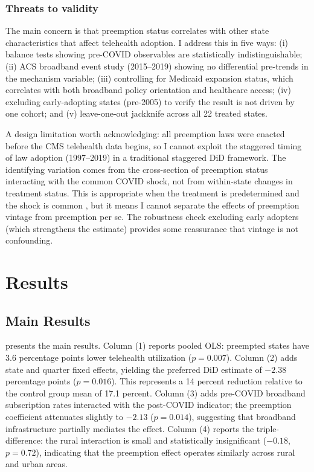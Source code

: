 \documentclass[12pt]{article}
\begin{document}
\subsubsection*{Threats to validity} The main concern is that preemption status correlates with other state characteristics that affect telehealth adoption. I address this in five ways: (i) balance tests showing pre-COVID observables are statistically indistinguishable; (ii) ACS broadband event study (2015--2019) showing no differential pre-trends in the mechanism variable; (iii) controlling for Medicaid expansion status, which correlates with both broadband policy orientation and healthcare access; (iv) excluding early-adopting states (pre-2005) to verify the result is not driven by one cohort; and (v) leave-one-out jackknife across all 22 treated states.

A design limitation worth acknowledging: all preemption laws were enacted before the CMS telehealth data begins, so I cannot exploit the staggered timing of law adoption (1997--2019) in a traditional staggered DiD framework. The identifying variation comes from the cross-section of preemption status interacting with the common COVID shock, not from within-state changes in treatment status. This is appropriate when the treatment is predetermined and the shock is common \citep{athey2022design}, but it means I cannot separate the effects of preemption vintage from preemption per se. The robustness check excluding early adopters (which strengthens the estimate) provides some reassurance that vintage is not confounding.


\section{Results}

\subsection{Main Results}

 presents the main results. Column (1) reports pooled OLS: preempted states have 3.6 percentage points lower telehealth utilization ($p = 0.007$). Column (2) adds state and quarter fixed effects, yielding the preferred DiD estimate of $-2.38$ percentage points ($p = 0.016$). This represents a 14 percent reduction relative to the control group mean of 17.1 percent. Column (3) adds pre-COVID broadband subscription rates interacted with the post-COVID indicator; the preemption coefficient attenuates slightly to $-2.13$ ($p = 0.014$), suggesting that broadband infrastructure partially mediates the effect. Column (4) reports the triple-difference: the rural interaction is small and statistically insignificant ($-0.18$, $p = 0.72$), indicating that the preemption effect operates similarly across rural and urban areas.
\end{document}
